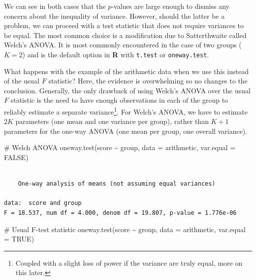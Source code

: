 \documentclass[
  11pt,
  letterpaper,
]{scrbook}
\newenvironment{Shaded}{\begin{snugshade}}{\end{snugshade}}
\newcommand{\AttributeTok}[1]{\textcolor[rgb]{0.40,0.45,0.13}{#1}}
\newcommand{\CommentTok}[1]{\textcolor[rgb]{0.37,0.37,0.37}{#1}}
\newcommand{\ConstantTok}[1]{\textcolor[rgb]{0.56,0.35,0.01}{#1}}
\newcommand{\FunctionTok}[1]{\textcolor[rgb]{0.28,0.35,0.67}{#1}}
\newcommand{\NormalTok}[1]{\textcolor[rgb]{0.00,0.23,0.31}{#1}}
\newcommand{\SpecialCharTok}[1]{\textcolor[rgb]{0.37,0.37,0.37}{#1}}
\theoremstyle{definition}
\theoremstyle{remark}
\begin{document}
We can see in both cases that the \(p\)-values are large enough to
dismiss any concern about the inequality of variance. However, should
the latter be a problem, we can proceed with a test statistic that does
not require variances to be equal. The most common choice is a
modification due to Satterthwaite called Welch's ANOVA. It is most
commonly encountered in the case of two groups (\(K=2\)) and is the
default option in \textbf{R} with \texttt{t.test} or
\texttt{oneway.test}.

What happens with the example of the arithmetic data when we use this
instead of the usual \(F\) statistic? Here, the evidence is overwhelming
so no changes to the conclusion. Generally, the only drawback of using
Welch's ANOVA over the usual \(F\) statistic is the need to have enough
observations in each of the group to reliably estimate a separate
variance\footnote{Coupled with a slight loss of power if the variance
  are truly equal, more on this later.}. For Welch's ANOVA, we have to
estimate \(2K\) parameters (one mean and one variance per group), rather
than \(K+1\) parameters for the one-way ANOVA (one mean per group, one
overall variance).

\begin{Shaded}
\begin{Highlighting}[]
\CommentTok{\# Welch ANOVA}
\FunctionTok{oneway.test}\NormalTok{(score }\SpecialCharTok{\textasciitilde{}}\NormalTok{ group, }\AttributeTok{data =}\NormalTok{ arithmetic, }
            \AttributeTok{var.equal =} \ConstantTok{FALSE}\NormalTok{)}
\end{Highlighting}
\end{Shaded}

\begin{verbatim}

    One-way analysis of means (not assuming equal variances)

data:  score and group
F = 18.537, num df = 4.000, denom df = 19.807, p-value = 1.776e-06
\end{verbatim}

\begin{Shaded}
\begin{Highlighting}[]
\CommentTok{\# Usual F{-}test statistic}
\FunctionTok{oneway.test}\NormalTok{(score }\SpecialCharTok{\textasciitilde{}}\NormalTok{ group, }\AttributeTok{data =}\NormalTok{ arithmetic, }
            \AttributeTok{var.equal =} \ConstantTok{TRUE}\NormalTok{)}
\end{Highlighting}
\end{Shaded}
\end{document}
